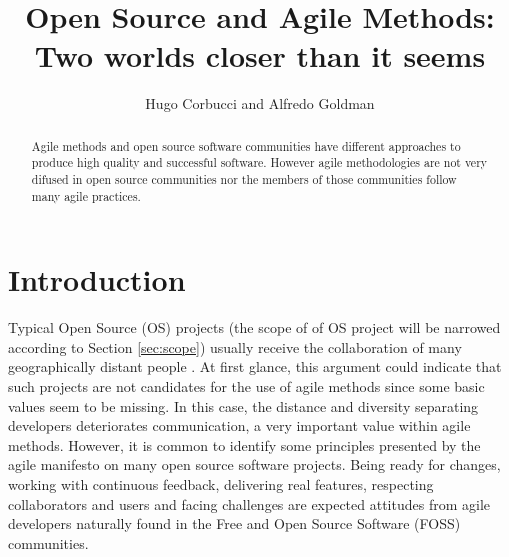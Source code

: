 \documentclass[lnbip]{svmultln}
\begin{document}
\mainmatter

\title{Open Source and Agile Methods:\\Two worlds closer than it
  seems}


\author{Hugo Corbucci and Alfredo Goldman}



 
\maketitle

\begin{abstract}
  Agile methods and open source software communities have different
  approaches to produce high quality and successful software. However
  agile methodologies are not very difused in open source communities
  nor the members of those communities follow many agile
  practices.


\end{abstract}

\section{Introduction}

Typical Open Source (OS) projects (the scope of of OS project will be
narrowed according to Section \ref{sec:scope}) usually receive
the collaboration of many geographically distant people
\cite{report:dempsey1999}. At first glance, this argument could
indicate that such projects are not candidates for the use of agile
methods since some basic values seem to be missing. In this case, the
distance and diversity separating developers deteriorates
communication, a very important value within agile methods. However,
it is common to identify some principles presented by the agile
manifesto \cite{url:agilemanifesto} on many open source software
projects. Being ready for changes, working with continuous feedback,
delivering real features, respecting collaborators and users and
facing challenges are expected attitudes from agile developers
naturally found in the Free and Open Source Software (FOSS)
communities\cite{gabriel2005}.
\end{document}
